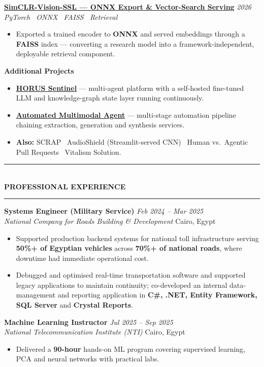 \documentclass[10pt, a4paper]{article}
\newcommand{\cvsection}[1]{%
  \vspace{3pt}%
  {\color{navy}\rule{\linewidth}{1.1pt}}\\[0.5pt]%
  {\color{navy}\bfseries\fontsize{9.5}{11}\selectfont\uppercase{#1}}\\[-4pt]%
  {\color{teal}\rule{\linewidth}{0.6pt}}%
  \vspace{2pt}%
}
\newcommand{\cventry}[4]{%
  \vspace{2.5pt}%
  \textbf{\color{darkgray}#1} \hfill {\color{midgray}\textit{#3}}\\[-1.5pt]%
  {\color{teal}\textit{#2}} \hfill {\color{midgray}#4}%
}
\newcommand{\cvproject}[3]{%
  \vspace{2.5pt}%
  {\bfseries\color{navy}#1} \hfill {\color{midgray}\textit{#3}}\\[-1.5pt]%
  {\color{teal}\textit{#2}}%
}
\newcommand{\cvmini}[2]{\item {\bfseries\color{navy}#1} --- #2}
\newenvironment{cvitems}{%
  \begin{itemize}[leftmargin=11pt, itemsep=0.5pt, parsep=0pt, topsep=1pt,
                  label={\textcolor{teal}{$\bullet$}}]
}{%
  \end{itemize}%
}
\begin{document}
\cvproject{\href{https://github.com/MahmoudAlyosify/SimCLR-Vision-SSL}{SimCLR-Vision-SSL --- ONNX Export \& Vector-Search Serving}}
          {PyTorch \textperiodcentered\ ONNX \textperiodcentered\ FAISS \textperiodcentered\ Retrieval}
          {2026}
\begin{cvitems}
  \item Exported a trained encoder to \textbf{ONNX} and served embeddings through a \textbf{FAISS} index --- converting a research model into a framework-independent, deployable retrieval component.
\end{cvitems}

\vspace{3pt}
{\bfseries\color{navy}Additional Projects}
\begin{cvitems}
  \cvmini{\href{https://github.com/MahmoudAlyosify/horus-sentinel}{HORUS Sentinel}}{multi-agent platform with a self-hosted fine-tuned LLM and knowledge-graph state layer running continuously.}
  \cvmini{\href{https://github.com/MahmoudAlyosify/Automated-Multimodal-Agent-PDF-to-Narrated-PowerPoint}{Automated Multimodal Agent}}{multi-stage automation pipeline chaining extraction, generation and synthesis services.}
  \item \textbf{Also:} SCRAP \textperiodcentered\ AudioShield (Streamlit-served CNN) \textperiodcentered\ Human vs.\ Agentic Pull Requests \textperiodcentered\ Vitalism Solution.
\end{cvitems}

\cvsection{Professional Experience}

\cventry{Systems Engineer (Military Service)}{National Company for Roads Building \& Development}
        {Feb 2024 -- Mar 2025}{Cairo, Egypt}
\begin{cvitems}
  \item Supported production backend systems for national toll infrastructure serving \textbf{50\%+ of Egyptian vehicles} across \textbf{70\%+ of national roads}, where downtime had immediate operational cost.
  \item Debugged and optimised real-time transportation software and supported legacy applications to maintain continuity; co-developed an internal data-management and reporting application in \textbf{C\#, .NET, Entity Framework, SQL Server} and \textbf{Crystal Reports}.
\end{cvitems}

\cventry{Machine Learning Instructor}{National Telecommunication Institute (NTI)}
        {Jul 2025 -- Sep 2025}{Cairo, Egypt}
\begin{cvitems}
  \item Delivered a \textbf{90-hour} hands-on ML program covering supervised learning, PCA and neural networks with practical labs.
\end{cvitems}
\end{document}
